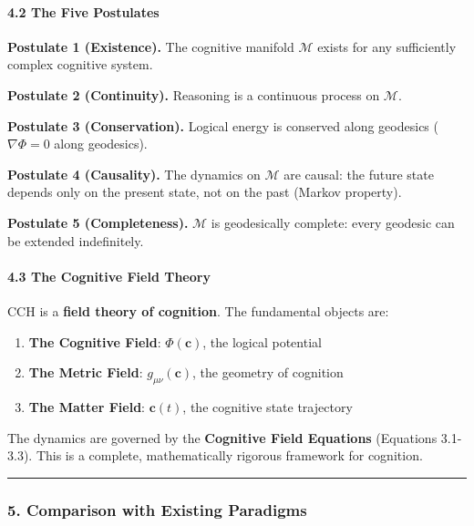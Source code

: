 \documentclass[
  11pt,
  a4paper,
]{article}
\providecommand{\tightlist}{%
  \setlength{\itemsep}{0pt}\setlength{\parskip}{0pt}}
\begin{document}
\paragraph{4.2 The Five Postulates}\label{the-five-postulates}

\textbf{Postulate 1 (Existence).} The cognitive manifold \(\mathcal{M}\)
exists for any sufficiently complex cognitive system.

\textbf{Postulate 2 (Continuity).} Reasoning is a continuous process on
\(\mathcal{M}\).

\textbf{Postulate 3 (Conservation).} Logical energy is conserved along
geodesics (\(\nabla \Phi = 0\) along geodesics).

\textbf{Postulate 4 (Causality).} The dynamics on \(\mathcal{M}\) are
causal: the future state depends only on the present state, not on the
past (Markov property).

\textbf{Postulate 5 (Completeness).} \(\mathcal{M}\) is geodesically
complete: every geodesic can be extended indefinitely.

\paragraph{4.3 The Cognitive Field
Theory}\label{the-cognitive-field-theory}

CCH is a \textbf{field theory of cognition}. The fundamental objects
are:

\begin{enumerate}
\def\labelenumi{\arabic{enumi}.}
\tightlist
\item
  \textbf{The Cognitive Field}: \(\Phi(\mathbf{c})\), the logical
  potential
\item
  \textbf{The Metric Field}: \(g_{\mu\nu}(\mathbf{c})\), the geometry of
  cognition
\item
  \textbf{The Matter Field}: \(\mathbf{c}(t)\), the cognitive state
  trajectory
\end{enumerate}

The dynamics are governed by the \textbf{Cognitive Field Equations}
(Equations 3.1-3.3). This is a complete, mathematically rigorous
framework for cognition.

\begin{center}\rule{0.5\linewidth}{0.5pt}\end{center}

\subsubsection{5. Comparison with Existing
Paradigms}\label{comparison-with-existing-paradigms}
\end{document}
